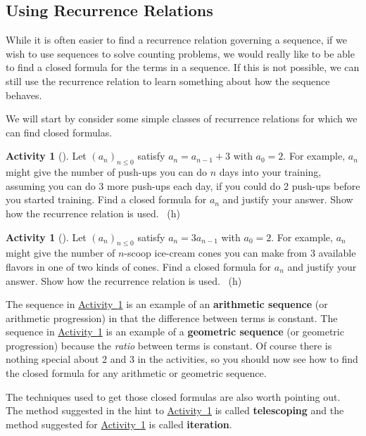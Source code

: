 \documentclass[10pt,]{book}
\newcommand{\terminology}[1]{\textbf{#1}}
\theoremstyle{plain}
\theoremstyle{definition}
\theoremstyle{definition}
\theoremstyle{definition}
\newtheorem{activity}[project]{Activity}
\numberwithin{equation}{chapter}
\begin{document}
\subsection[{Using Recurrence Relations}]{Using Recurrence Relations}\label{subsec-recursionclosed}
\hypertarget{p-920}{}%
While it is often easier to find a recurrence relation governing a sequence, if we wish to use sequences to solve counting problems, we would really like to be able to find a closed formula for the terms in a sequence. If this is not possible, we can still use the recurrence relation to learn something about how the sequence behaves.%
\par
\hypertarget{p-921}{}%
We will start by consider some simple classes of recurrence relations for which we can find closed formulas.%
\begin{activity}[]\label{act-arithmetic}
\hypertarget{p-922}{}%
Let \((a_n)_{n \le 0}\) satisfy \(a_n = a_{n-1} + 3\) with \(a_0 = 2\).  For example, \(a_n\) might give the number of push-ups you can do \(n\) days into your training, assuming you can do 3 more push-ups each day, if you could do 2 push-ups before you started training.  Find a closed formula for \(a_n\) and justify your answer.  Show how the recurrence relation is used.%
~{\tiny (h)}\end{activity}
\begin{activity}[]\label{act-geometric}
\hypertarget{p-924}{}%
Let \((a_n)_{n \le 0}\) satisfy \(a_n = 3a_{n-1}\) with \(a_0 = 2\).  For example, \(a_n\) might give the number of \(n\)-scoop ice-cream cones you can make from 3 available flavors in one of two kinds of cones.  Find a closed formula for \(a_n\) and justify your answer.  Show how the recurrence relation is used.%
~{\tiny (h)}\end{activity}
\hypertarget{p-926}{}%
The sequence in \hyperref[act-arithmetic]{Activity~\ref{act-arithmetic}} is an example of an \terminology{arithmetic sequence} (or arithmetic progression) in that the difference between terms is constant.  The sequence in \hyperref[act-geometric]{Activity~\ref{act-geometric}} is an example of a \terminology{geometric sequence} (or geometric progression) because the \emph{ratio} between terms is constant.  Of course there is nothing special about 2 and 3 in the activities, so you should now see how to find the closed formula for any arithmetic or geometric sequence.%
\par
\hypertarget{p-927}{}%
The techniques used to get those closed formulas are also worth pointing out.  The method suggested in the hint to \hyperref[act-arithmetic]{Activity~\ref{act-arithmetic}} is called \terminology{telescoping} and the method suggested for \hyperref[act-geometric]{Activity~\ref{act-geometric}} is called \terminology{iteration}.%
\end{document}
